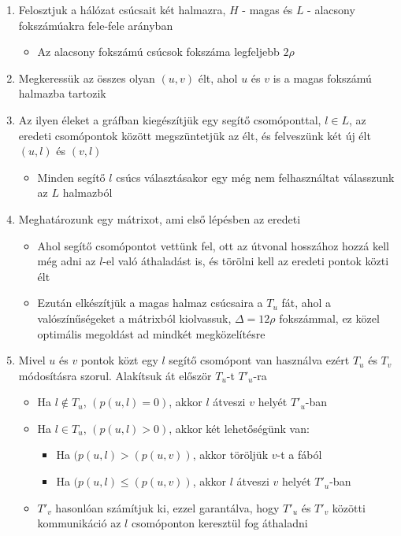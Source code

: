 \documentclass[12pt]{report}
\begin{document}
\begin{enumerate}
	\item Felosztjuk a hálózat csúcsait két halmazra, \(H\) - magas és \(L\) - alacsony fokszámúakra fele-fele arányban
	\begin{itemize}
		\item Az alacsony fokszámú csúcsok fokszáma legfeljebb \(2\rho\)
	\end{itemize}
	\item Megkeressük az összes olyan \((u, v)\) élt, ahol \(u\) és \(v\) is a magas fokszámú halmazba tartozik
	\item Az ilyen éleket a gráfban kiegészítjük egy segítő csomóponttal, \(l \in L\), az eredeti csomópontok között megszüntetjük az élt, és felveszünk két új élt \((u, l)\) és \((v, l)\)
	\begin{itemize}
		\item Minden segítő \(l\) csúcs választásakor egy még nem felhasználtat válasszunk az \(L\) halmazból
	\end{itemize}
	\item Meghatározunk egy mátrixot, ami első lépésben az eredeti
	\begin{itemize}
		\item Ahol segítő csomópontot vettünk fel, ott az útvonal hosszához hozzá kell még adni az \(l\)-el való áthaladást is, és törölni kell az eredeti pontok közti élt
		\item Ezután elkészítjük a magas halmaz csúcsaira a \(T_u\) fát, ahol a valószínűségeket a mátrixból kiolvassuk, \(\Delta = 12\rho\) fokszámmal, ez közel optimális megoldást ad mindkét megközelítésre
	\end{itemize}
	\item Mivel \(u\) és \(v\) pontok közt egy \(l\) segítő csomópont van használva ezért \(T_u\) és \(T_v\) módosításra szorul. Alakítsuk át először \(T_u\)-t \(T'_u\)-ra
	\begin{itemize}
		\item Ha \(l \notin T_u\), \((p(u, l) = 0)\), akkor \(l\) átveszi \(v\) helyét \(T'_u\)-ban
		\item Ha \(l \in T_u\), \((p(u, l) > 0)\), akkor két lehetőségünk van:
		\begin{itemize}
			\item Ha \((p(u, l) > (p(u, v))\), akkor töröljük \(v\)-t a fából
			\item Ha \((p(u, l) \le (p(u, v))\), akkor \(l\) átveszi \(v\) helyét \(T'_u\)-ban
		\end{itemize}
		\item \(T'_v\) hasonlóan számítjuk ki, ezzel garantálva, hogy \(T'_u\) és \(T'_v\) közötti kommunikáció az \(l\) csomóponton keresztül fog áthaladni

\end{itemize}
\end{enumerate}
\end{document}
